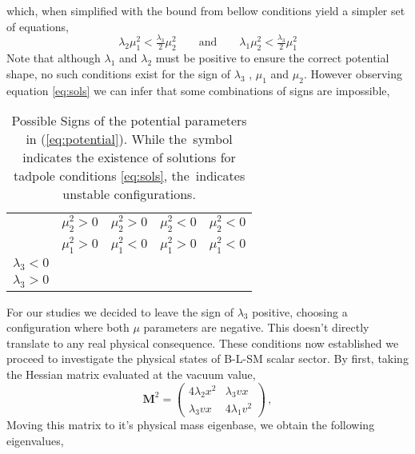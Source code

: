 %
which, when simplified with the bound from bellow conditions yield a simpler set of equations,
%
\begin{equation}
\lambda_2 \mu_1^2 < \tfrac{\lambda_3}{2} \mu_2^2 
\qquad
\text{and}
\qquad
\lambda_1 \mu_2^2 < \tfrac{\lambda_3}{2} \mu_1^2
\label{eq:sols}
\end{equation}
%
Note that although $\lambda_1$ and $\lambda_2$ must be positive to ensure the correct potential shape, no such conditions exist for the sign of $\lambda_3$ , $\mu_1$ and $\mu_2$. However observing equation \ref{eq:sols} we can infer that some combinations of signs are impossible, 
%
\begin{table}[htb!]
	\begin{center}
		\begin{tabular}{|ccccc|}
			\hline  
			& $\mu_2^2 > 0$ & $\mu_2^2 > 0$ & $\mu_2^2 < 0$ & $\mu_2^2 < 0$  	\\
			& $\mu_1^2 > 0$ & $\mu_1^2 < 0$ & $\mu_1^2 > 0$ & $\mu_1^2 < 0$  	\\        
			\hline
			$\lambda_3 < 0 $     			    							& \xmark		& \checkmark	&	\checkmark & \checkmark	\\
			$\lambda_3 > 0$     			    							& \xmark		& \xmark	&	\xmark &  \checkmark \\
			\hline
		\end{tabular} 
		\caption{Possible Signs of the potential parameters in (\ref{eq:potential}). 
While the \checkmark\,symbol indicates the existence of solutions for tadpole conditions \eqref{eq:sols}, the \xmark\,indicates unstable configurations.}
		\label{tab:signs}  
	\end{center}
\end{table} 
%
For our studies we decided to leave the sign of $\lambda_3$ positive, choosing a configuration where both $\mu$ parameters are negative. This doesn't directly translate to any real physical consequence.  
%
These conditions now established we proceed to investigate the physical states of B-L-SM scalar sector. By first, taking the Hessian matrix evaluated at the vacuum value, 
%
\begin{equation}
\mathbf{M}^2 =
\begin{pmatrix}
4 \lambda_2 x^2 & \lambda_3 v x \\ 
\lambda_3 v x   & 4 \lambda_1 v^2 
\end{pmatrix}\,,
\label{eq:hess}
\end{equation}
% 
Moving this matrix to it's physical mass eigenbase, we obtain the following eigenvalues,
%
